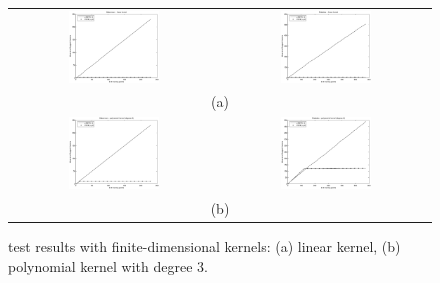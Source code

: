 \begin{figure}[!htbp]
  \begin{center}
    \begin{tabular}{cc}
       \includegraphics[width=0.45\textwidth]{Haberman_lin} &
       \includegraphics[width=0.45\textwidth]{Diabetes_lin} \\
       \multicolumn{2}{c}{(a)} \\
       \includegraphics[width=0.45\textwidth]{Haberman_poly3} &
       \includegraphics[width=0.45\textwidth]{Diabetes_poly3} \\
       \multicolumn{2}{c}{(b)} \\
    \end{tabular}
  \end{center}
  \caption{\label{fig:finite} test results with finite-dimensional
  kernels: (a) linear kernel, (b) polynomial kernel with degree $3$.}
\end{figure}

